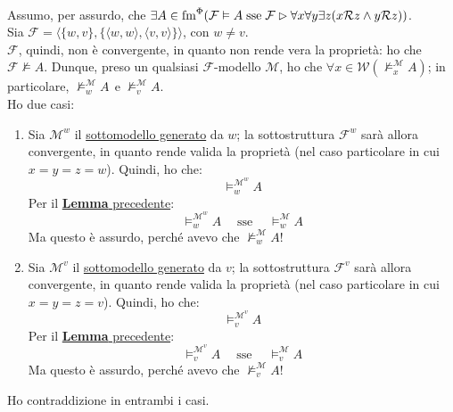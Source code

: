\documentclass[a4paper,12pt]{article}
\newcommand{\latinmodern}[1]{\text{#1}}
\newcommand{\latinmath}[1]{\text{\latinmodern{#1}}} %
\begin{document}
\begin{dimo}
	 \phantom{ciao} \\
	Assumo, per assurdo, che $\exists A \in \latinmath{fm}^{\Phi} (\mathcal{F} \vDash A \; \text{sse} \; \mathcal{F} \rhd \forall x \forall y \exists z (x\mathcal{R}z \land y\mathcal{R}z))$. \\
	Sia $\mathcal{F} = \langle  \{w, v\}, \{\langle w, w \rangle, \langle v, v\rangle\} \rangle$, con $w \neq v$. \\
	$\mathcal{F}$, quindi, non è convergente, in quanto non rende vera la proprietà: ho che $\mathcal{F} \nvDash A$. Dunque, preso un qualsiasi $\mathcal{F}$-modello $\mathcal{M}$, ho che $\forall x \in \mathcal{W} (\nvDash_x^{\mathcal{M}} A)$; in particolare, $\nvDash_w^{\mathcal{M}} A \;\, \text{e} \; \nvDash_v^{\mathcal{M}} A$. \\
	Ho due casi:
	\begin{enumerate}
		\item Sia $\mathcal{M}^{w}$ il \hyperlink{modgen}{sottomodello generato} da $w$; la sottostruttura  $\mathcal{F}^{w}$ sarà allora convergente, in quanto rende valida la proprietà (nel caso particolare in cui $x=y=z=w$). Quindi, ho che:
		      $$\vDash_w^{\mathcal{M}^{w}} A$$
		      Per il \hyperlink{lemgen}{\textbf{Lemma} precedente}: $$\vDash_w^{\mathcal{M}^{w}} A \quad \; \text{sse} \quad \; \vDash_w^{\mathcal{M}} A$$
		      Ma questo è assurdo, perché avevo che $\nvDash_w^{\mathcal{M}} A$!
		\item Sia $\mathcal{M}^{v}$ il \hyperlink{modgen}{sottomodello generato} da $v$; la sottostruttura  $\mathcal{F}^{v}$ sarà allora convergente,  in quanto rende valida la proprietà (nel caso particolare in cui $x=y=z=v$). Quindi, ho che:
		      $$\vDash_v^{\mathcal{M}^{v}} A$$
		      Per il \hyperlink{lemgen}{\textbf{Lemma} precedente}: $$\vDash_v^{\mathcal{M}^{v}} A \quad \; \text{sse} \quad \; \vDash_v^{\mathcal{M}} A$$
		      Ma questo è assurdo, perché avevo che $\nvDash_v^{\mathcal{M}} A$!
	\end{enumerate}
	Ho contraddizione in entrambi i casi. \\
\end{dimo}
\end{document}
